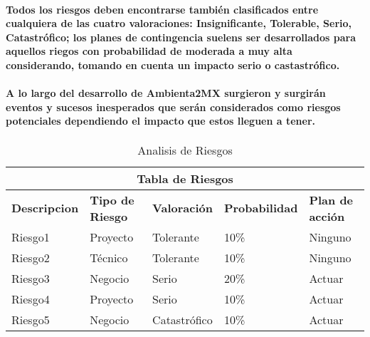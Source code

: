     \paragraph{Todos los riesgos deben encontrarse también clasificados entre cualquiera de las cuatro valoraciones: Insignificante, Tolerable, Serio, Catastrófico; los planes de contingencia suelens ser desarrollados para aquellos riegos con probabilidad de moderada a muy alta considerando, tomando en cuenta un impacto serio o castastrófico.}
    \paragraph{A lo largo del desarrollo de Ambienta2MX surgieron y surgirán eventos y sucesos inesperados que serán considerados como riesgos potenciales dependiendo el impacto que estos lleguen a tener.}
    \begin{table}[h]
    \centering
      \begin{tabular}{lllll}
        \hline
        \multicolumn{5}{c}{{\bf Tabla de Riesgos}} \\ \hline
        \multicolumn{1}{|l|}{{\bf Descripcion}} & \multicolumn{1}{l|}{{\bf Tipo de Riesgo}} & \multicolumn{1}{l|}{{\bf Valoración}} & \multicolumn{1}{l|}{{\bf Probabilidad}} & \multicolumn{1}{l|}{{\bf Plan de acción}} \\ \hline
        \multicolumn{1}{|l|}{Riesgo1} & \multicolumn{1}{l|}{Proyecto} & \multicolumn{1}{l|}{Tolerante} & \multicolumn{1}{l|}{10\%} & \multicolumn{1}{l|}{Ninguno} \\ \hline
        \multicolumn{1}{|l|}{Riesgo2} & \multicolumn{1}{l|}{Técnico} & \multicolumn{1}{l|}{Tolerante} & \multicolumn{1}{l|}{10\%} & \multicolumn{1}{l|}{Ninguno} \\ \hline
        \multicolumn{1}{|l|}{Riesgo3} & \multicolumn{1}{l|}{Negocio} & \multicolumn{1}{l|}{Serio} & \multicolumn{1}{l|}{20\%} & \multicolumn{1}{l|}{Actuar} \\ \hline
        \multicolumn{1}{|l|}{Riesgo4} & \multicolumn{1}{l|}{Proyecto} & \multicolumn{1}{l|}{Serio} & \multicolumn{1}{l|}{10\%} & \multicolumn{1}{l|}{Actuar} \\ \hline
        \multicolumn{1}{|l|}{Riesgo5} & \multicolumn{1}{l|}{Negocio} & \multicolumn{1}{l|}{Catastrófico} & \multicolumn{1}{l|}{10\%} & \multicolumn{1}{l|}{Actuar} \\ \hline
      \end{tabular}
      \caption{Analisis de Riesgos}
      \label{Analisis de riesgos}
    \end{table}